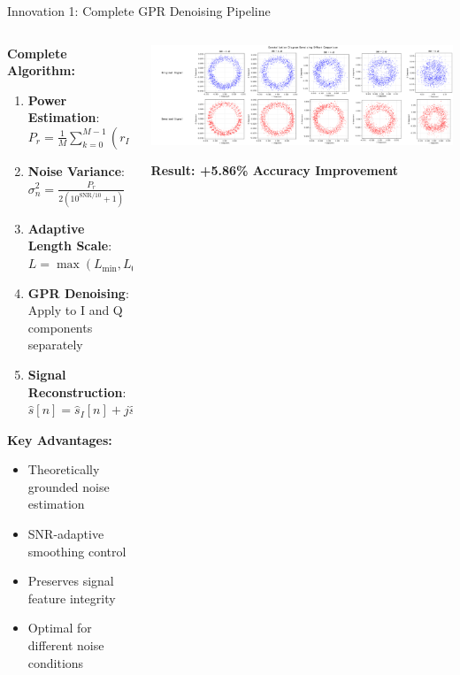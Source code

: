 \documentclass[aspectratio=169]{beamer}
\begin{document}
\begin{frame}{Innovation 1: Complete GPR Denoising Pipeline}
\begin{columns}
\begin{column}{0.6\textwidth}
\textbf{Complete Algorithm:}
\begin{enumerate}
\item \textbf{Power Estimation}: $P_r = \frac{1}{M}\sum_{k=0}^{M-1}(r_I[k]^2+r_Q[k]^2)$
\item \textbf{Noise Variance}: $\sigma_n^2 = \frac{P_r}{2(10^{\text{SNR}/10} + 1)}$
\item \textbf{Adaptive Length Scale}: $L = \max(L_{\min}, L_0(1 + \text{SNR}/20))$
\item \textbf{GPR Denoising}: Apply to I and Q components separately
\item \textbf{Signal Reconstruction}: $\hat{s}[n] = \hat{s}_I[n] + j\hat{s}_Q[n]$
\end{enumerate}

\vspace{0.1cm}
\textbf{Key Advantages:}
\begin{itemize}
\setlength{\itemsep}{0em}
\item \textcolor{zjutgreen}{Theoretically grounded noise estimation}
\item \textcolor{zjutgreen}{SNR-adaptive smoothing control}
\item \textcolor{zjutgreen}{Preserves signal feature integrity}
\item \textcolor{zjutgreen}{Optimal for different noise conditions}
\end{itemize}
\end{column}
\begin{column}{0.4\textwidth}
\includegraphics[width=\textwidth]{figure/constellation_denoising.png}

\vspace{0.3cm}
\begin{center}
\textcolor{zjutblue}{\textbf{Result: +5.86\% Accuracy Improvement}}
\end{center}
\end{column}
\end{columns}
\end{frame}
\end{document}
